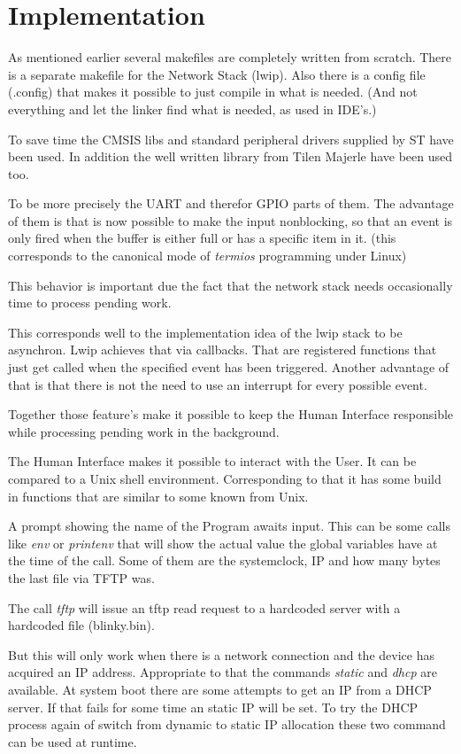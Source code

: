 \chapter{Implementation}
As mentioned earlier several makefiles are completely written from scratch.
There is a separate makefile for the Network Stack (lwip).
Also there is a config file (.config) that makes it possible to just compile in what is needed.
(And not everything and let the linker find what is needed, as used in IDE's.)

To save time the CMSIS libs and standard peripheral drivers supplied by ST have been used.
In addition the well written library from Tilen Majerle \citep{TM} have been used too.

To be more precisely the UART and therefor GPIO parts of them.
The advantage of them is that is now possible to make the input nonblocking,
so that an event is only fired when the buffer is either full or has a specific item in it.
(this corresponds to the canonical mode of \textit{termios} programming under Linux)

This behavior is important due the fact that the network stack needs occasionally time to
process pending work.

This corresponds well to the implementation idea of the lwip stack to be asynchron.
Lwip achieves that via callbacks.
That are registered functions that just get called when the specified event has been triggered.
Another advantage of that is that there is not the need to use an interrupt for every possible event.

Together those feature's make it possible to keep the Human Interface responsible
while processing pending work in the background.

The Human Interface makes it possible to interact with the User.
It can be compared to a Unix shell environment.
Corresponding to that it has some build in functions that are similar to some known from Unix.

A prompt showing the name of the Program awaits input.
This can be some calls like \textit{env} or \textit{printenv} that will show the
actual value the global variables have at the time of the call.
Some of them are the systemclock, IP and how many bytes the last file via TFTP was.

The call \textit{tftp} will issue an tftp read request to a hardcoded
server with a hardcoded file (blinky.bin).

But this will only work when there is a network connection and the device has acquired an IP address.
Appropriate to that the commands \textit{static} and \textit{dhcp} are available.
At system boot there are some attempts to get an IP from a DHCP server.
If that fails for some time an static IP will be set.
To try the DHCP process again of switch from dynamic to static IP allocation
these two command can be used at runtime.

